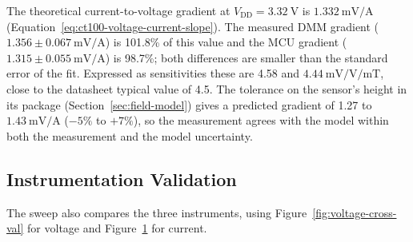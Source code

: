 \documentclass[12pt,a4paper]{article}
\begin{document}
\begin{figure}[H]
\begin{minipage}[t]{0.48\textwidth}

        \label{fig:current-cross-val}

    \end{minipage}
\end{figure}

The theoretical current-to-voltage gradient at $V_{\text{DD}} = \SI{3.32}{\volt}$ is $\SI{1.332}{\milli\volt\per\ampere}$ (Equation~\eqref{eq:ct100-voltage-current-slope}). The measured DMM gradient ($1.356 \pm \SI{0.067}{\milli\volt\per\ampere}$) is 101.8\% of this value and the MCU gradient ($1.315 \pm \SI{0.055}{\milli\volt\per\ampere}$) is 98.7\%; both differences are smaller than the standard error of the fit. Expressed as sensitivities these are 4.58 and $\SI{4.44}{\milli\volt\per\volt\per\milli\tesla}$, close to the datasheet typical value of 4.5. The tolerance on the sensor's height in its package (Section~\ref{sec:field-model}) gives a predicted gradient of 1.27 to $\SI{1.43}{\milli\volt\per\ampere}$ ($-5\%$ to $+7\%$), so the measurement agrees with the model within both the measurement and the model uncertainty.

\subsection{Instrumentation Validation}
\label{sec:instr-validation}

The sweep also compares the three instruments, using Figure~\ref{fig:voltage-cross-val} for voltage and Figure~\ref{fig:current-cross-val} for current.
\end{document}
